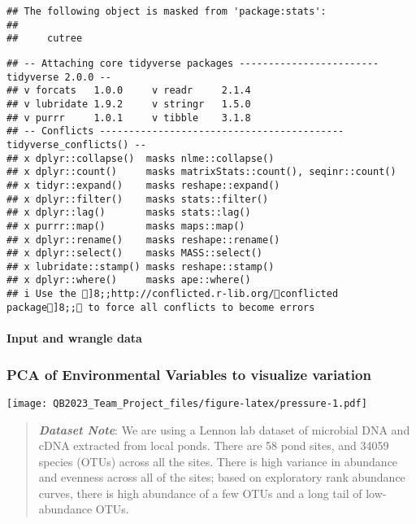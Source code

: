 \documentclass[
]{article}
\begin{document}
\begin{verbatim}
## The following object is masked from 'package:stats':
## 
##     cutree
\end{verbatim}

\begin{verbatim}
## -- Attaching core tidyverse packages ------------------------ tidyverse 2.0.0 --
## v forcats   1.0.0     v readr     2.1.4
## v lubridate 1.9.2     v stringr   1.5.0
## v purrr     1.0.1     v tibble    3.1.8
## -- Conflicts ------------------------------------------ tidyverse_conflicts() --
## x dplyr::collapse()  masks nlme::collapse()
## x dplyr::count()     masks matrixStats::count(), seqinr::count()
## x tidyr::expand()    masks reshape::expand()
## x dplyr::filter()    masks stats::filter()
## x dplyr::lag()       masks stats::lag()
## x purrr::map()       masks maps::map()
## x dplyr::rename()    masks reshape::rename()
## x dplyr::select()    masks MASS::select()
## x lubridate::stamp() masks reshape::stamp()
## x dplyr::where()     masks ape::where()
## i Use the ]8;;http://conflicted.r-lib.org/conflicted package]8;; to force all conflicts to become errors
\end{verbatim}

\hypertarget{input-and-wrangle-data}{%
\paragraph{Input and wrangle data}\label{input-and-wrangle-data}}

\hypertarget{pca-of-environmental-variables-to-visualize-variation}{%
\subsubsection{PCA of Environmental Variables to visualize
variation}\label{pca-of-environmental-variables-to-visualize-variation}}

\texttt{[image: QB2023\_Team\_Project\_files/figure-latex/pressure-1.pdf]}

\begin{quote}
\textbf{\emph{Dataset Note}}: We are using a Lennon lab dataset of
microbial DNA and cDNA extracted from local ponds. There are 58 pond
sites, and 34059 species (OTUs) across all the sites. There is high
variance in abundance and evenness across all of the sites; based on
exploratory rank abundance curves, there is high abundance of a few OTUs
and a long tail of low-abundance OTUs.
\end{quote}
\end{document}
